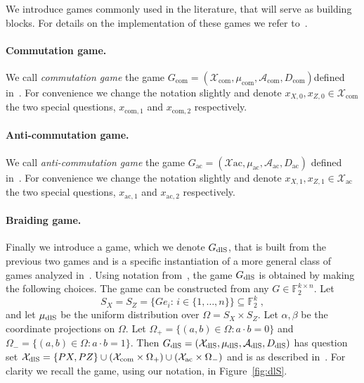 \documentclass[11pt]{article}
\theoremstyle{definition}
\newcommand{\field}{\mathbb{F}_2}
\newcommand{\dlS}{\ensuremath{\rm dlS}}
\newcommand{\F}{\ensuremath{\mathbb{F}}}
\newcommand{\mA}{\ensuremath{\mathcal{A}}}
\newcommand{\mX}{\ensuremath{\mathcal{X}}}
\newcommand{\cc}{\mathrm{com}}
\newcommand{\ac}{\mathrm{ac}}
\begin{document}
We introduce games commonly used in the literature, that will serve as building blocks. For details on the implementation of these games we refer to~\cite{de2022spectral}.

\paragraph{Commutation game.}
We call \emph{commutation game} the game $G_{\cc}=(\mX_\cc,\mu_\cc,\mA_\cc,D_\cc)$defined in~\cite[Section 3.1]{de2022spectral}. For convenience we change the notation slightly and denote $x_{X,0}, x_{Z,0} \in \mX_{\cc}$ the two special questions, $x_{\cc,1}$ and $x_{\cc,2}$ respectively. 

\paragraph{Anti-commutation game.}
We call \emph{anti-commutation game} the game $G_\ac=(\mX\ac,\mu_\ac,\mA_\ac,D_\ac)$ defined in~\cite[Section 3.2]{de2022spectral}. For convenience we change the notation slightly and  denote $x_{X,1}, x_{Z,1} \in \mX_{\ac}$ the two special questions, $x_{\ac,1}$ and $x_{\ac,2}$ respectively. 

\paragraph{Braiding game.}
Finally we introduce a game, which we denote $G_{\dlS}$, that is built from the previous two games and is a specific instantiation of a more general class of games analyzed in~\cite[Section 3.4]{de2022spectral}.  Using notation from~\cite{de2022spectral}, the game $G_{\dlS}$ is obtained by making the following choices. The game can be constructed from any $G\in\F_2^{k\times n}$. Let 
\[ S_X=S_Z=\{G e_i:\,i\in\{1,\ldots,n\}\}\subseteq \field^k\;,\]
and let $\mu_{\dlS}$ be the uniform distribution over $\Omega=S_X\times S_Z$. Let $\alpha,\beta$ be the coordinate projections on $\Omega$. Let $\Omega_+ = \{(a,b)\in \Omega:a\cdot b=0\}$ and $\Omega_-=\{(a,b)\in\Omega:a\cdot b=1\}$. Then $G_{\dlS}=(\mX_{\dlS},\mu_{\dlS},\mA_{\dlS},D_{\dlS})$ has question set $\mX_{\dlS} = \{PX,PZ\} \cup (\mX_{\cc}\times \Omega_+) \cup (\mX_{\ac} \times \Omega_-)$ and is as described in~\cite[Section 3.4]{de2022spectral}. For clarity we recall the game, using our notation, in Figure~\ref{fig:dlS}. 
\end{document}
